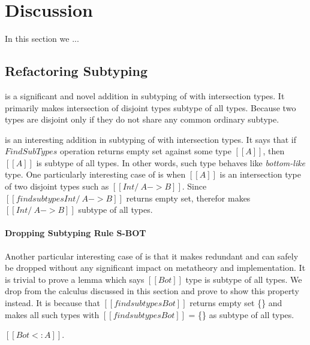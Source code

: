 \section{Discussion}
\label{sec:discussion}
In this section we ...

\subsection{Refactoring Subtyping}
\label{sec:inter:refactoring}

 is a significant and novel addition in subtyping of \cal 
with intersection types. It primarily
makes intersection of disjoint types subtype of all types.
Because two types are disjoint only if they do not share any common ordinary subtype.

 is an interesting addition in subtyping of \cal with intersection types.
It says that if $FindSubTypes$ operation returns empty set against some type $[[A]]$, then $[[A]]$
is subtype of all types. In other words, such type behaves like \emph{bottom-like} type.
One particularly interesting case of  is when $[[A]]$ is an intersection type of two
disjoint types such as $[[Int /\ A -> B]]$. Since $[[findsubtypes Int /\ A -> B]]$ returns empty set,
therefor  makes $[[Int /\ A -> B]]$ subtype of all types.

\paragraph{Dropping Subtyping Rule S-BOT}
Another particular interesting case of  is that it makes  redundant 
and  can safely be dropped without any significant
impact on metatheory and implementation. It is trivial to prove a lemma which says $[[Bot]]$ type is
subtype of all types. We drop  from the calculus discussed in this section
and prove  to show this property instead. It is because that $[[findsubtypes Bot]]$
returns empty set \{\} and  makes all such types with $[[findsubtypes Bot]]$ = \{\} as
subtype of all types.

\begin{lemma}
  $[[Bot <: A]]$.
\label{lemma:inter:bls}
\end{lemma}